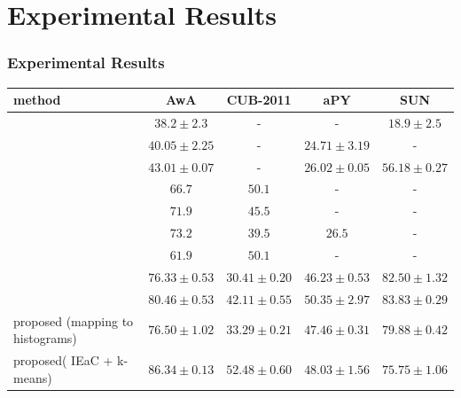 \documentclass{beamer}
\begin{document}
\section{Experimental Results}
\label{sec:Experimental Results}

\begin{frame}\frametitle{Experimental Results}
  \begin{center}
  {\scriptsize
  \begin{tabular}{|l|c|c|c|c|}
  \hline
  method  & AwA & CUB-2011 & aPY & SUN \\
  \hline

    {\tiny \cite{li15max}}                 &  $38.2 \pm 2.3$   &    -             &  -                       & $18.9 \pm 2.5$ \\
   {\tiny \cite{semi15}}                    &  $40.05\pm 2.25$ &       -          &   $24.71 \pm 3.19$       & -    \\
    {\tiny \cite{jayaraman14}}  & $43.01 \pm 0.07$ &       -          & $26.02 \pm 0.05$        & $56.18 \pm 0.27$ \\
  \hline
   {\tiny \cite{Akata2015}}              & $66.7$          & $50.1$            &         -                & -\\
   {\tiny \cite{Xian2016}}                & $71.9$            & $45.5$            &        -                 & -\\
  \hline
  {\tiny \cite{Kodirov2015}}
                                              & $73.2$            &  $39.5$           & $26.5$                    &  -\\
   {\tiny \cite{Akata2015}}              & $61.9$            &  $50.1$           &                 -        & -\\
    {\tiny \cite{sse}}            &  $76.33 \pm 0.53$ & $30.41 \pm 0.20$ &   $46.23 \pm 0.53$      & $82.50 \pm 1.32$    \\
   {\tiny \cite{agnostic} }      &  $80.46 \pm 0.53$ & $42.11 \pm 0.55$ &   \textbf{$\mathbf{50.35 \pm 2.97}$}      & $83.83 \pm 0.29$    \\
    {\tiny proposed (mapping to histograms)}
                          & $76.50 \pm 1.02$               & $33.29 \pm 0.21$              & $47.46 \pm 0.31$              & $79.88 \pm 0.42$ \\
   {\tiny proposed( IEaC +  {k-means})}
                            & $86.34 \pm 0.13$               & $52.48 \pm 0.60$              & $48.03 \pm 1.56$              & $75.75 \pm 1.06$ \\

\end{tabular}}
\end{center}
\end{frame}
\end{document}
